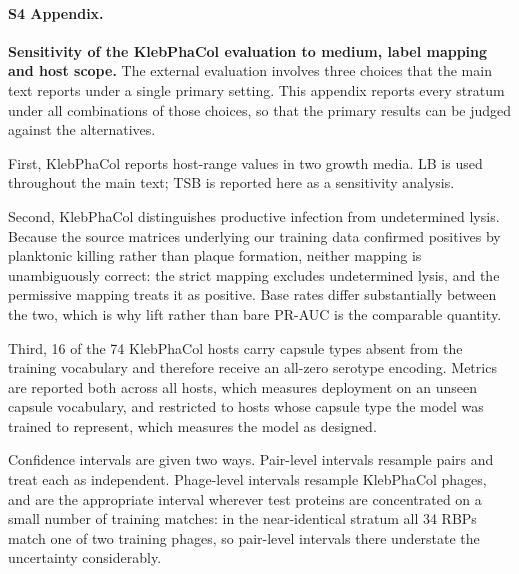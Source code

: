 
\paragraph*{S4 Appendix.}
\label{S4_Appendix}
{\bf Sensitivity of the KlebPhaCol evaluation to medium, label mapping and host
scope.} The external evaluation involves three choices that the main text
reports under a single primary setting. This appendix reports every stratum
under all combinations of those choices, so that the primary results can be
judged against the alternatives.

First, KlebPhaCol reports host-range values in two growth media. LB is used
throughout the main text; TSB is reported here as a sensitivity analysis.

Second, KlebPhaCol distinguishes productive infection from undetermined lysis.
Because the source matrices underlying our training data confirmed positives by
planktonic killing rather than plaque formation, neither mapping is
unambiguously correct: the strict mapping excludes undetermined lysis, and the
permissive mapping treats it as positive. Base rates differ substantially
between the two, which is why lift rather than bare PR-AUC is the comparable
quantity.

Third, 16 of the 74 KlebPhaCol hosts carry capsule types absent from the
training vocabulary and therefore receive an all-zero serotype encoding. Metrics
are reported both across all hosts, which measures deployment on an unseen
capsule vocabulary, and restricted to hosts whose capsule type the model was
trained to represent, which measures the model as designed.

Confidence intervals are given two ways. Pair-level intervals resample pairs and
treat each as independent. Phage-level intervals resample KlebPhaCol phages, and
are the appropriate interval wherever test proteins are concentrated on a small
number of training matches: in the near-identical stratum all 34 RBPs match one
of two training phages, so pair-level intervals there understate the uncertainty
considerably.


